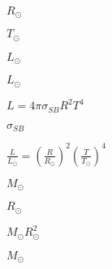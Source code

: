 \documentclass{article}
\begin{document}
$ R_{\odot} $
\pagebreak

$ T_{\odot} $
\pagebreak

$ L_{\odot} $
\pagebreak

$ L_{\odot}$
\pagebreak

$ L = 4\pi\sigma_{SB}R^2T^4 $
\pagebreak

$ \sigma_{SB} $
\pagebreak

$ \frac{L}{L_{\odot}} = \left( \frac{R}{R_{\odot}} \right)^2 \left( \frac{T}{T_{\odot}} \right)^4 $
\pagebreak

$ M_{\odot}$
\pagebreak

$ R_{\odot}$
\pagebreak

$ M_{\odot}R_{\odot}^2$
\pagebreak

$ M_{\odot} $
\pagebreak
\end{document}
